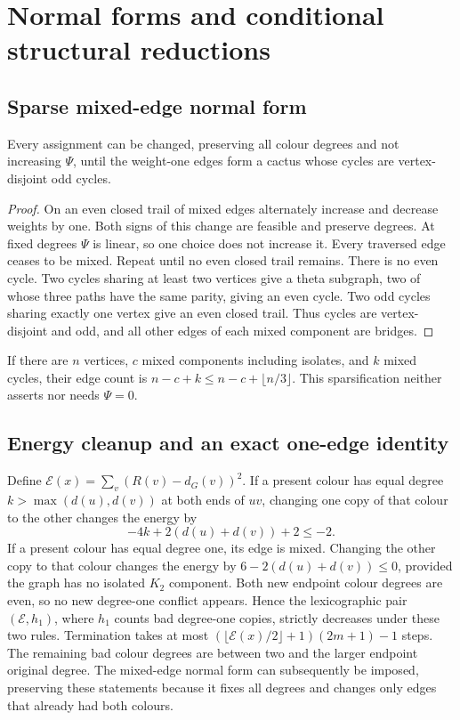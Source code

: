 \section{Normal forms and conditional structural reductions}\label{sec:reductions}

\subsection{Sparse mixed-edge normal form}

\begin{proposition}\label{prop:normalform}
Every assignment can be changed, preserving all colour degrees and
not increasing $\Psi$, until the weight-one edges form a cactus
whose cycles are vertex-disjoint odd cycles.
\end{proposition}
\begin{proof}
On an even closed trail of mixed edges alternately increase and
decrease weights by one. Both signs of this change are feasible and
preserve degrees. At fixed degrees $\Psi$ is linear, so one choice
does not increase it. Every traversed edge ceases to be mixed.
Repeat until no even closed trail remains. There is no even cycle.
Two cycles sharing at least two vertices give a theta subgraph, two
of whose three paths have the same parity, giving an even cycle.
Two odd cycles sharing exactly one vertex give an even closed trail.
Thus cycles are vertex-disjoint and odd, and all other edges of each
mixed component are bridges.
\end{proof}

If there are $n$ vertices, $c$ mixed components including isolates,
and $k$ mixed cycles, their edge count is $n-c+k\le n-c+\lfloor n/3\rfloor$.
This sparsification neither asserts nor needs $\Psi=0$.

\subsection{Energy cleanup and an exact one-edge identity}

Define $\mathcal E(x)=\sum_v(R(v)-d_G(v))^2$. If a present colour
has equal degree $k>\max(d(u),d(v))$ at both ends of $uv$, changing
one copy of that colour to the other changes the energy by
\[
 -4k+2(d(u)+d(v))+2\le-2.
\]
If a present colour has equal degree one, its edge is mixed. Changing
the other copy to that colour changes the energy by
$6-2(d(u)+d(v))\le0$, provided the graph has no isolated $K_2$
component. Both new endpoint colour degrees are even, so no new
degree-one conflict appears. Hence the lexicographic pair
$(\mathcal E,h_1)$, where $h_1$ counts bad degree-one copies, strictly
decreases under these two rules. Termination takes at most
$(\lfloor\mathcal E(x)/2\rfloor+1)(2m+1)-1$ steps. The remaining
bad colour degrees are between two and the larger endpoint original
degree. The mixed-edge normal form can subsequently be imposed,
preserving these statements because it fixes all degrees and changes
only edges that already had both colours.

